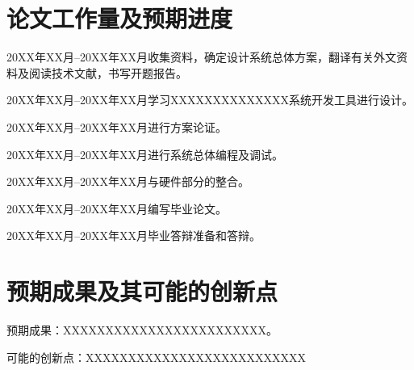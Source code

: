 \documentclass{sdjuproposal}
\begin{document}
\section{论文工作量及预期进度}

\begin{schedule}
  \item{20XX年XX月--20XX年XX月}{收集资料，确定设计系统总体方案，翻译有关外文资料及阅读技术文献，书写开题报告。}
  \item{20XX年XX月--20XX年XX月}{学习XXXXXXXXXXXXXX系统开发工具进行设计。}
  \item{20XX年XX月--20XX年XX月}{进行方案论证。}
  \item{20XX年XX月--20XX年XX月}{进行系统总体编程及调试。}
  \item{20XX年XX月--20XX年XX月}{与硬件部分的整合。}
  \item{20XX年XX月--20XX年XX月}{编写毕业论文。}
  \item{20XX年XX月--20XX年XX月}{毕业答辩准备和答辩。}
\end{schedule}

\section{预期成果及其可能的创新点}

预期成果：XXXXXXXXXXXXXXXXXXXXXXXX。

可能的创新点：XXXXXXXXXXXXXXXXXXXXXXXXXX

\nocite{*}
\sdjubibliography

\supervisoropinion{}   %
\committeeopinion      %
\end{document}
